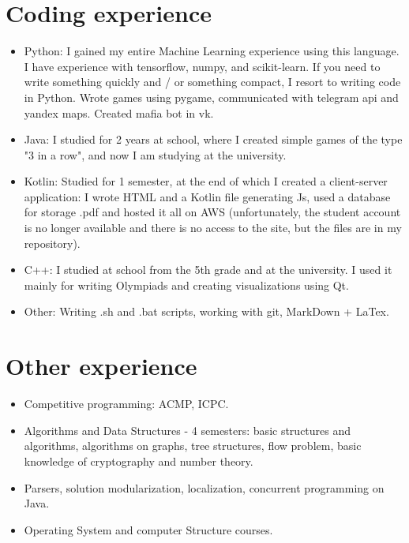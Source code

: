 \documentclass[letter]{deedy-resume}
\begin{document}
    \begin{minipage}[t]{0.6\textwidth}

        \section{Coding experience}

        \begin{itemize}[leftmargin=1em]
            \setlength\itemsep{0em}
            \item Python: I gained my entire Machine Learning experience using this language.
            I have experience with tensorflow, numpy, and scikit-learn.
            If you need to write something quickly and / or something compact, I resort to writing code in Python.
            Wrote games using pygame, communicated with telegram api and yandex maps.
            Created mafia bot in vk.
            \item Java: I studied for 2 years at school, where I created simple games of the type "3 in a row",
            and now I am studying at the university.
            \item Kotlin: Studied for 1 semester, at the end of which I created a client-server application:
            I wrote HTML and a Kotlin file generating Js, used a database for storage .pdf and hosted it all on AWS
            (unfortunately, the student account is no longer available and there is no access to the site,
            but the files are in my repository).
            \item C++: I studied at school from the 5th grade and at the university.
            I used it mainly for writing Olympiads and creating visualizations using Qt.
            \item Other: Writing .sh and .bat scripts, working with git, MarkDown + LaTex.
        \end{itemize}

        \sectionspace %


        \section{Other experience}

        \begin{itemize}[leftmargin=1em]
            \setlength\itemsep{0em}
            \item Competitive programming: ACMP,  ICPC.
            \item Algorithms and Data Structures - 4 semesters: basic structures and algorithms,
            algorithms on graphs, tree structures, flow problem, basic knowledge of cryptography and number theory.
            \item Parsers, solution modularization, localization, concurrent programming on Java.
            \item Operating System and computer Structure courses.
        \end{itemize}


\end{minipage}
\end{document}
